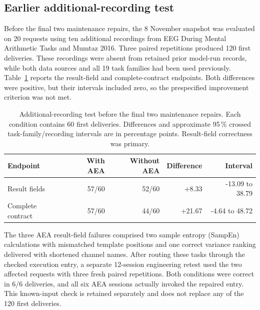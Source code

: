 \subsection{Earlier additional-recording test}
\label{sec:additional-recordings}

Before the final two maintenance repairs, the 8 November snapshot was evaluated on 20 requests using ten additional recordings from EEG During Mental Arithmetic Tasks and Mumtaz 2016. Three paired repetitions produced 120 first deliveries. These recordings were absent from retained prior model-run records, while both data sources and all 19 task families had been used previously. Table~\ref*{tab:additional-validation} reports the result-field and complete-contract endpoints. Both differences were positive, but their intervals included zero, so the prespecified improvement criterion was not met.

\begin{table}[!htbp]
\centering\small
\caption{Additional-recording test before the final two maintenance repairs. Each condition contains 60 first deliveries. Differences and approximate 95\,\% crossed task-family/recording intervals are in percentage points. Result-field correctness was primary.}
\label{tab:additional-validation}
\begin{tabular}{lrrrr}
\toprule
Endpoint & With AEA & Without AEA & Difference & Interval \\
\midrule
Result fields & 57/60 & 52/60 & +8.33 & -13.09 to 38.79 \\
Complete contract & 57/60 & 44/60 & +21.67 & -4.64 to 48.72 \\
\bottomrule
\end{tabular}
\end{table}

The three AEA result-field failures comprised two sample entropy (SampEn) calculations with mismatched template positions and one correct variance ranking delivered with shortened channel names. After routing these tasks through the checked execution entry, a separate 12-session engineering retest used the two affected requests with three fresh paired repetitions. Both conditions were correct in 6/6 deliveries, and all six AEA sessions actually invoked the repaired entry. This known-input check is retained separately and does not replace any of the 120 first deliveries.

